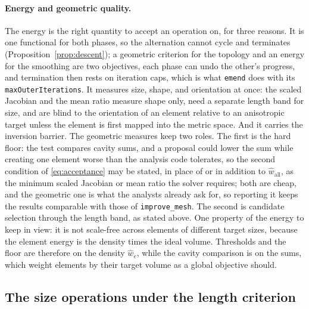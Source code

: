 \documentclass[11pt]{article}
\newcommand{\code}[1]{\texttt{#1}}
\begin{document}
\paragraph{Energy and geometric quality.} The energy is the right
quantity to accept an operation on, for three reasons. It is one
functional for both phases, so the alternation cannot cycle and
terminates (Proposition~\ref{prop:descent}); a geometric criterion for
the topology and an energy for the smoothing are two objectives, each
phase can undo the other's progress, and termination then rests on
iteration caps, which is what \code{emend} does with its
\code{maxOuterIterations}. It measures size, shape, and orientation at
once: the scaled Jacobian and the mean ratio measure shape only, need a
separate length band for size, and are blind to the orientation of an
element relative to an anisotropic target unless the element is first
mapped into the metric space. And it carries the inversion barrier. The
geometric measures keep two roles. The first is the hard floor: the
test compares cavity sums, and a proposal could lower the sum while
creating one element worse than the analysis code tolerates, so the
second condition of \eqref{eq:acceptance} may be stated, in place of or in
addition to $\hat w_{\text{all}}$, as the minimum scaled Jacobian or
mean ratio the solver requires; both are cheap, and the geometric one
is what the analysts already ask for, so reporting it keeps the results
comparable with those of \code{improve\_mesh}. The second is candidate
selection through the length band, as stated above. One property of the
energy to keep in view: it is not scale-free across elements of
different target sizes, because the element energy is the density times
the ideal volume. Thresholds and the floor are therefore on the density
$\hat w_e$, while the cavity comparison is on the sums, which weight
elements by their target volume as a global objective should.

\subsection{The size operations under the length criterion}
\label{sec:length}
\end{document}
